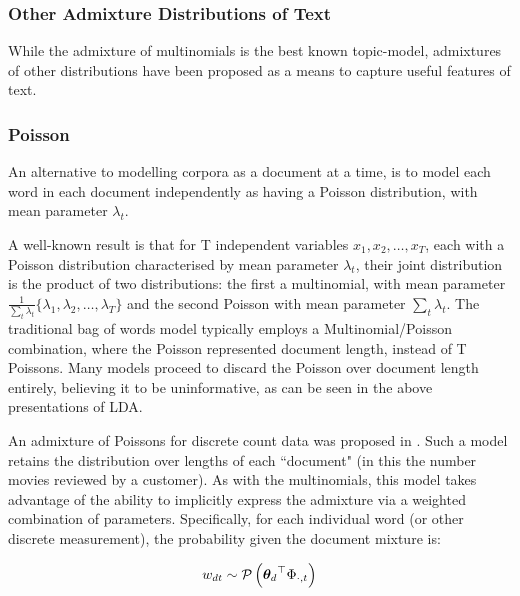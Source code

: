 

\subsubsection{Other Admixture Distributions of Text}

While the admixture of multinomials is the best known topic-model, admixtures of other distributions have been proposed as a means to capture useful features of text.

%
%

\subsubsection*{Poisson}
An alternative to modelling corpora as a document at a time, is to model each word in each document independently as having a Poisson distribution, with mean parameter $\lambda_t$. 

A well-known result\cite{Bishop2006}\cite{Inouye2014} is that for T independent variables $x_1, x_2, \ldots, x_T$, each with a Poisson distribution characterised by mean parameter $\lambda_t$, their joint distribution is the product of two distributions: the first a multinomial, with mean parameter $\frac{1}{\sum_t \lambda_t} \{\lambda_1, \lambda_2, \ldots, \lambda_T\}$ and the second Poisson with mean parameter $\sum_t \lambda_t$. The traditional bag of words model typically employs a Multinomial/Poisson combination, where the Poisson represented document length, instead of T Poissons. Many models proceed to discard the Poisson over document length entirely, believing it to be uninformative, as can be seen in the above presentations of LDA.

An admixture of Poissons for discrete count data was proposed in \cite{Gopalan2013}. Such a model retains the distribution over lengths of each ``document" (in this the number movies reviewed by a customer). As with the multinomials, this model takes advantage of the ability to implicitly express the admixture via a weighted combination of parameters. Specifically, for each individual word (or other discrete measurement), the probability given the document mixture is:


\begin{align}
w_{dt} \sim \mathcal{P} \left( {{ \bm \theta_d }^\top\Phi_{\cdot,t}} \right)
\end{align}

